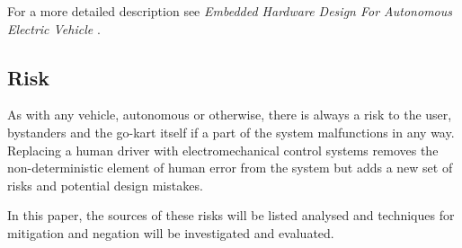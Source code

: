 For a more detailed description see \emph{Embedded Hardware Design For Autonomous Electric
Vehicle} \cite{jenkins_2011}.

\subsection{Risk}
As with any vehicle, autonomous or otherwise, there is always a risk to the user, bystanders and
 the go-kart itself if a part of the system malfunctions in any way. Replacing a human driver with 
 electromechanical control systems removes the non-deterministic element of human error 
 from the system but adds a new set of risks and potential design mistakes.
 
 In this paper, the sources of these risks will be listed analysed and techniques for mitigation and
 negation will be investigated and evaluated.


